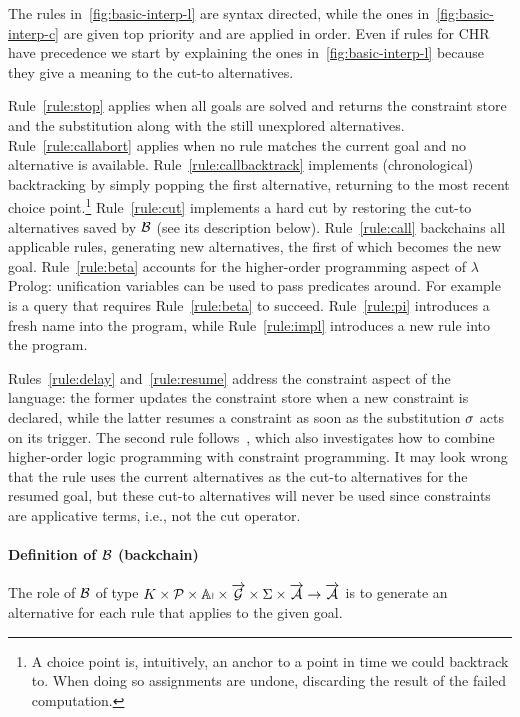 \documentclass{these-ISSS}
\begin{document}
The rules in~\cref{fig:basic-interp-l} are syntax directed, while the ones
in~\cref{fig:basic-interp-c} are given top priority and are applied in order. 
Even if rules for CHR have precedence we start by explaining the ones
in~\cref{fig:basic-interp-l} because they give a meaning to the cut-to
alternatives.

Rule~\ref{rule:stop} applies when all goals are solved and returns the
constraint store and the
substitution along with the still unexplored alternatives. Rule~\ref{rule:callabort}
applies when no rule matches the current goal and no alternative is available.
Rule~\ref{rule:callbacktrack} implements (chronological) backtracking by simply
popping the first alternative, returning to the most recent choice point.\footnote{A
choice point is, intuitively, an anchor to a point in time we could backtrack to.
When doing so assignments are undone, discarding the result of the failed computation.}
Rule~\ref{rule:cut} implements a hard cut by restoring the cut-to alternatives
saved by $\mathcal{B}$ (see its description below). Rule~\ref{rule:call} backchains
all applicable rules, generating new alternatives, the first of which becomes
the new goal. Rule~\ref{rule:beta} accounts for the higher-order programming
aspect of $\lambda$Prolog: unification variables can be used to pass predicates
around. For example  is a query that requires Rule~\ref{rule:beta}
to succeed.
Rule~\ref{rule:pi} introduces a fresh name into the program, while
Rule~\ref{rule:impl} introduces a new rule into the program.

Rules~\ref{rule:delay} and~\ref{rule:resume}
address the constraint aspect of the language: the former updates the constraint
store when a new constraint is declared, while the latter resumes a constraint
as soon as the substitution $\sigma$ acts on its trigger. The second rule
follows~\cite{Michaylov1993HigherOrderLP}, which also investigates how to
combine higher-order logic programming with constraint programming. It may look
wrong that the rule
uses the current alternatives as the cut-to alternatives for the resumed goal,
but these cut-to alternatives will never be used since constraints are
applicative terms, i.e., not the cut operator.

\paragraph{Definition of $\mathcal{B}$ (backchain)}\label{backchain}

The role of $\mathcal{B}$ of type $K \times \mathcal{P} \times \APP \times \vecL{\g} \times \Sigma \times \vecL{\alt} \to \vecL{\alt}$ is to generate
an alternative for each rule that applies to the given goal.
\end{document}
